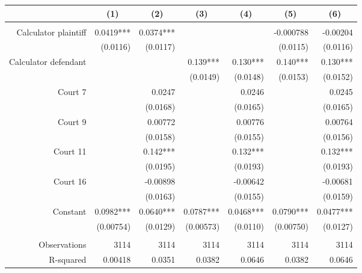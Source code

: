 \begin{tabular}{rrrrrrr}
\toprule
      & \multicolumn{1}{c}{(1)} & \multicolumn{1}{c}{(2)} & \multicolumn{1}{c}{(3)} & \multicolumn{1}{c}{(4)} & \multicolumn{1}{c}{(5)} & \multicolumn{1}{c}{(6)} \\
\midrule
      &       &       &       &       &       &  \\
Calculator plaintiff & 0.0419*** & 0.0374*** &       &       & -0.000788 & -0.00204 \\
      & (0.0116) & (0.0117) &       &       & (0.0115) & (0.0116) \\
Calculator defendant &       &       & 0.139*** & 0.130*** & 0.140*** & 0.130*** \\
      &       &       & (0.0149) & (0.0148) & (0.0153) & (0.0152) \\
Court 7 &       & 0.0247 &       & 0.0246 &       & 0.0245 \\
      &       & (0.0168) &       & (0.0165) &       & (0.0165) \\
Court 9 &       & 0.00772 &       & 0.00776 &       & 0.00764 \\
      &       & (0.0158) &       & (0.0155) &       & (0.0156) \\
Court 11 &       & 0.142*** &       & 0.132*** &       & 0.132*** \\
      &       & (0.0195) &       & (0.0193) &       & (0.0193) \\
Court 16 &       & -0.00898 &       & -0.00642 &       & -0.00681 \\
      &       & (0.0163) &       & (0.0155) &       & (0.0159) \\
Constant & 0.0982*** & 0.0640*** & 0.0787*** & 0.0468*** & 0.0790*** & 0.0477*** \\
      & (0.00754) & (0.0129) & (0.00573) & (0.0110) & (0.00750) & (0.0127) \\
      &       &       &       &       &       &  \\
Observations & 3114  & 3114  & 3114  & 3114  & 3114  & 3114 \\
R-squared & 0.00418 & 0.0351 & 0.0382 & 0.0646 & 0.0382 & 0.0646 \\
\bottomrule
\end{tabular}%
